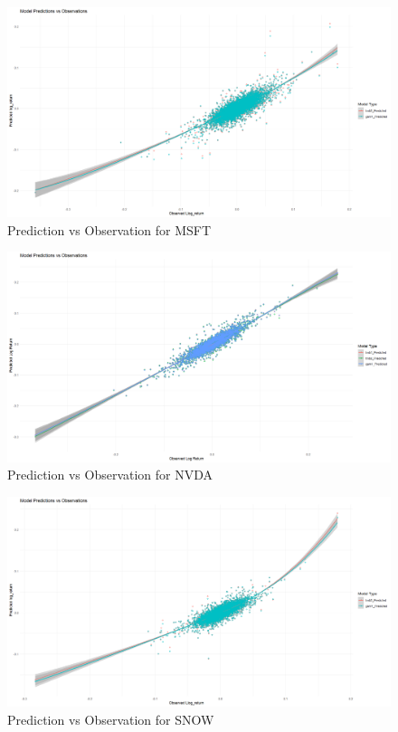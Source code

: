 \documentclass{article}
\begin{document}
\begin{figure}[h]
    \centering
    \includegraphics[width=0.9\linewidth]{visuals/pred_obs_msft.png}
    \caption{Prediction vs Observation for MSFT}
\end{figure}

\begin{figure}[h]
    \centering
    \includegraphics[width=0.9\linewidth]{visuals/pred_obs_nvda.png}
    \caption{Prediction vs Observation for NVDA}
\end{figure}

\begin{figure}[h]
    \centering
    \includegraphics[width=0.9\linewidth]{visuals/pred_obs_snow.png}
    \caption{Prediction vs Observation for SNOW}
\end{figure}
\end{document}
